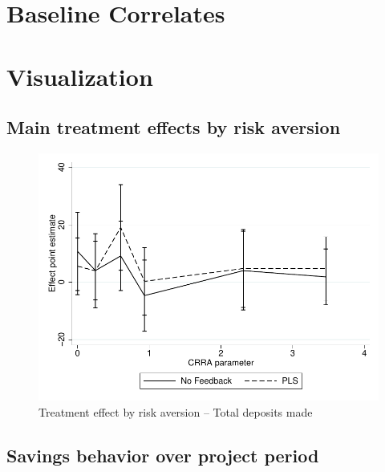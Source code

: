 \documentclass[11pt]{article}
\begin{document}
\clearpage

\section{Baseline Correlates}

    
    

\clearpage

\section{Visualization}

	\subsection{Main treatment effects by risk aversion}

		\begin{figure}[ht]
		\centering
		\caption{Treatment effect by risk aversion -- Total deposits made}
		\includegraphics[width=\textwidth]{../../figures/line-mobile_totdepositsbyrisk.pdf}
		\end{figure}

	\clearpage

	\subsection{Savings behavior over project period}
\end{document}
